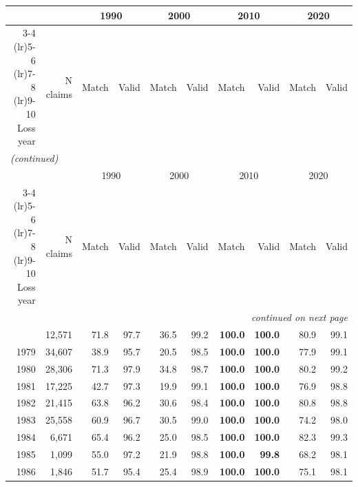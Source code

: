 {\small\setlength{\tabcolsep}{4pt}
\begin{longtable}{rrrrrrrrrr}
\toprule
 &  & \multicolumn{2}{c}{1990} & \multicolumn{2}{c}{2000} & \multicolumn{2}{c}{2010} & \multicolumn{2}{c}{2020} \\
\cmidrule(lr){3-4} \cmidrule(lr){5-6} \cmidrule(lr){7-8} \cmidrule(lr){9-10}
Loss year & N claims & Match & Valid & Match & Valid & Match & Valid & Match & Valid \\
\midrule
\endfirsthead
\multicolumn{10}{l}{\itshape (continued)}\\
\toprule
 &  & \multicolumn{2}{c}{1990} & \multicolumn{2}{c}{2000} & \multicolumn{2}{c}{2010} & \multicolumn{2}{c}{2020} \\
\cmidrule(lr){3-4} \cmidrule(lr){5-6} \cmidrule(lr){7-8} \cmidrule(lr){9-10}
Loss year & N claims & Match & Valid & Match & Valid & Match & Valid & Match & Valid \\
\midrule
\endhead
\midrule
\multicolumn{10}{r}{\itshape continued on next page}\\
\endfoot
\endlastfoot
1978 & 12,571 & 71.8 & 97.7 & 36.5 & 99.2 & \cellcolor{gray!15}\textbf{100.0} & \cellcolor{gray!15}\textbf{100.0} & 80.9 & 99.1 \\
1979 & 34,607 & 38.9 & 95.7 & 20.5 & 98.5 & \cellcolor{gray!15}\textbf{100.0} & \cellcolor{gray!15}\textbf{100.0} & 77.9 & 99.1 \\
1980 & 28,306 & 71.3 & 97.9 & 34.8 & 98.7 & \cellcolor{gray!15}\textbf{100.0} & \cellcolor{gray!15}\textbf{100.0} & 80.2 & 99.2 \\
1981 & 17,225 & 42.7 & 97.3 & 19.9 & 99.1 & \cellcolor{gray!15}\textbf{100.0} & \cellcolor{gray!15}\textbf{100.0} & 76.9 & 98.8 \\
1982 & 21,415 & 63.8 & 96.2 & 30.6 & 98.4 & \cellcolor{gray!15}\textbf{100.0} & \cellcolor{gray!15}\textbf{100.0} & 80.8 & 98.8 \\
1983 & 25,558 & 60.9 & 96.7 & 30.5 & 99.0 & \cellcolor{gray!15}\textbf{100.0} & \cellcolor{gray!15}\textbf{100.0} & 74.2 & 98.0 \\
1984 & 6,671 & 65.4 & 96.2 & 25.0 & 98.5 & \cellcolor{gray!15}\textbf{100.0} & \cellcolor{gray!15}\textbf{100.0} & 82.3 & 99.3 \\
1985 & 1,099 & 55.0 & 97.2 & 21.9 & 98.8 & \cellcolor{gray!15}\textbf{100.0} & \cellcolor{gray!15}\textbf{99.8} & 68.2 & 98.1 \\
1986 & 1,846 & 51.7 & 95.4 & 25.4 & 98.9 & \cellcolor{gray!15}\textbf{100.0} & \cellcolor{gray!15}\textbf{100.0} & 75.1 & 98.1 \\

\end{longtable}}
